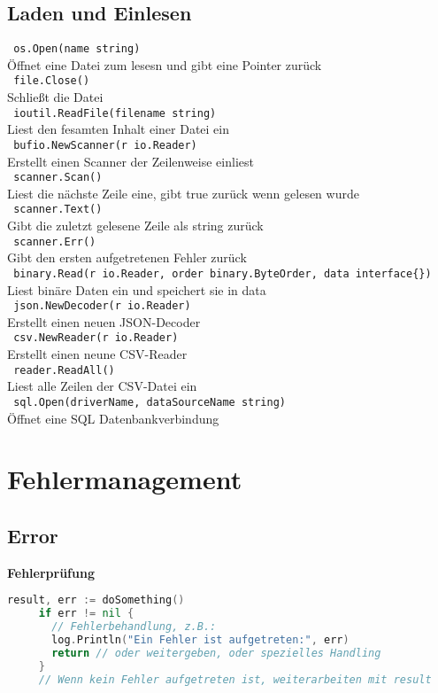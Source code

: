 \documentclass[twoside,a4paper,12pt]{article}
\begin{document}
\subsection{Laden und Einlesen}
\verb| os.Open(name string) | \\ 
Öffnet eine Datei zum lesesn und gibt eine Pointer zurück \\ 
\verb| file.Close() | \\ 
Schließt die Datei \\ 
\verb| ioutil.ReadFile(filename string) | \\ 
Liest den fesamten Inhalt einer Datei ein \\
\verb| bufio.NewScanner(r io.Reader) | \\ 
Erstellt einen Scanner der Zeilenweise einliest \\ 
\verb| scanner.Scan() | \\ 
Liest die nächste Zeile eine, gibt true zurück wenn gelesen wurde \\ 
\verb| scanner.Text() | \\ 
Gibt die zuletzt gelesene Zeile als string zurück \\ 
\verb| scanner.Err() | \\ 
Gibt den ersten aufgetretenen Fehler zurück \\ 
\verb| binary.Read(r io.Reader, order binary.ByteOrder, data interface{}) | \\ 
Liest binäre Daten ein und speichert sie in data \\ 
\verb| json.NewDecoder(r io.Reader) | \\ 
Erstellt einen neuen JSON-Decoder \\ 
\verb| csv.NewReader(r io.Reader) | \\ 
Erstellt einen neune CSV-Reader \\ 
\verb| reader.ReadAll() | \\ 
Liest alle Zeilen der CSV-Datei ein \\ 
\verb| sql.Open(driverName, dataSourceName string) | \\ 
Öffnet eine SQL Datenbankverbindung \\

\section{Fehlermanagement}
\subsection{Error}
\textbf{Fehlerprüfung}
\begin{center}
  \begin{minipage}{1.0\textwidth}
    \begin{lstlisting}[language=Go]
     result, err := doSomething()
     if err != nil {
       // Fehlerbehandlung, z.B.:
       log.Println("Ein Fehler ist aufgetreten:", err)
       return // oder weitergeben, oder spezielles Handling
     }
     // Wenn kein Fehler aufgetreten ist, weiterarbeiten mit result
    \end{lstlisting}
  \end{minipage}
\end{center}
\end{document}
